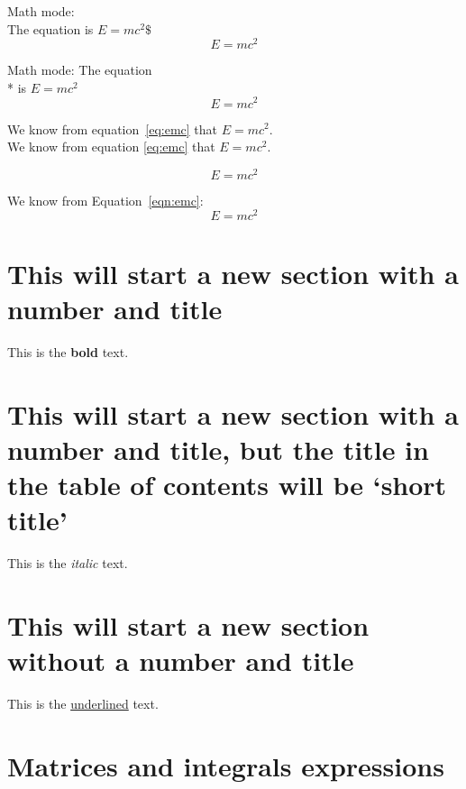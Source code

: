 \documentclass[12pt, a4paper]{article}
\begin{document}
Math mode: \\
\hspace{2cm}The equation is $E = mc^2\$$ %
\[
    E=mc^2 %
\]

Math mode: \newline
The equation\\* is \(E = mc^2\) %
\[E=mc^2\]

We know from equation~\ref{eq:emc} that $E=mc^2$.\\ %
We know from equation \ref{eq:emc} \dotfill that $E=mc^2$. %

\begin{equation}
    E=mc^2
    \label{eq:emc}
\end{equation}

We know from Equation~\ref{eqn:emc}:
\begin{equation}
    E = mc^2
    \label{eqn:emc}
\end{equation}

\section{This will start a new section with a number and title}

This is the \textbf{bold} text.

\section[short title]{This will start a new section with a number and title, but the title in the table of contents will be `short title'} %

This is the \textit{italic} text.

\section*{This will start a new section without a number and title}

This is the \underline{underlined} text.

\section[matrices and integrals]{Matrices and integrals expressions}
\end{document}
